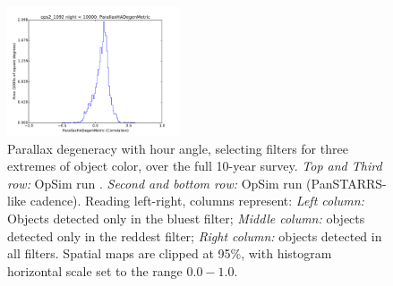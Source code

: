 \begin{figure}[ht]
\begin{center}
  \includegraphics[width=2.0in]{./figs/milkyway/MW_Astrom_paDegen_1092_10y_hst.pdf}
  \end{center}
  \caption{Parallax degeneracy with hour angle, selecting filters for three extremes of object color, over the full 10-year survey. {\it Top and Third row:} OpSim run . {\it Second and bottom row:} OpSim run  (PanSTARRS-like cadence). Reading left-right, columns represent: {\it Left column:} Objects detected only in the bluest filter; {\it Middle column:} objects detected only in the reddest filter; {\it Right column:} objects detected in all filters. Spatial maps are clipped at 95\%, with histogram horizontal scale set to the range $0.0-1.0$.}
  \label{fig_astrom_ByFilter_PADegen}
\end{figure}

